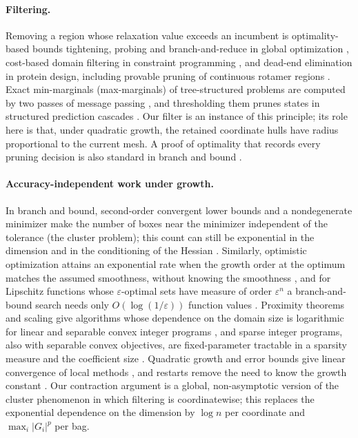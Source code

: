 \paragraph{Filtering.}
Removing a region whose relaxation value exceeds an incumbent is
optimality-based bounds tightening, probing and branch-and-reduce in global
optimization \cite{RyooSahinidis1996,BelottiEtAl2009,GleixnerEtAl2017,PuranikSahinidis2017},
cost-based domain filtering in constraint programming
\cite{FocacciLodiMilano1999}, and dead-end elimination in protein design,
including provable pruning of continuous rotamer regions
\cite{DesmetEtAl1992,GainzaRobertsDonald2012}. Exact min-marginals
(max-marginals) of tree-structured problems are computed by two passes of
message passing \cite{Dawid1992,AjiMcEliece2000,WainwrightJaakkolaWillsky2005,KohliTorr2006},
and thresholding them prunes states in structured prediction cascades
\cite{WeissTaskar2010}. Our filter is an instance of this principle; its
role here is that, under quadratic growth, the retained coordinate hulls
have radius proportional to the current mesh. A proof of optimality that
records every pruning decision is also standard in branch and bound
\cite{CheungGleixnerSteffy2017}.

\paragraph{Accuracy-independent work under growth.}
In branch and bound, second-order convergent lower bounds and a
nondegenerate minimizer make the number of boxes near the minimizer
independent of the tolerance (the cluster problem); this count can still be
exponential in the dimension and in the conditioning of the Hessian
\cite{DuKearfott1994,Neumaier2004,WechsungSchaberBarton2014,KannanBarton2017}.
Similarly, optimistic optimization attains an exponential rate when the
growth order at the optimum matches the assumed smoothness, without knowing
the smoothness \cite{Munos2011}, and for Lipschitz functions whose
$\varepsilon$-optimal sets have measure of order $\varepsilon^n$ a
branch-and-bound search needs only $O(\log(1/\varepsilon))$ function
values \cite{Perevozchikov1990}. Proximity theorems and scaling give algorithms whose dependence on the
domain size is logarithmic for linear and separable convex integer programs
\cite{CookGerardsSchrijverTardos1986,HochbaumShanthikumar1990,GranotSkorinKapov1990,HunkenschroderEtAl2026},
and sparse integer programs, also with separable convex objectives, are
fixed-parameter tractable in a sparsity measure and the coefficient size
\cite{EisenbrandEtAl2025}.
Quadratic growth and error bounds give linear convergence of local methods
\cite{LuoTseng1993,KarimiNutiniSchmidt2016,DrusvyatskiyLewis2018,NecoaraNesterovGlineur2019},
and restarts remove the need to know the growth constant
\cite{RouletDAspremont2020}. Our contraction argument is a global,
non-asymptotic version of the cluster phenomenon in which filtering is
coordinatewise; this replaces the exponential dependence on the dimension
by $\log n$ per coordinate and $\max_i|G_i|^p$ per bag.

